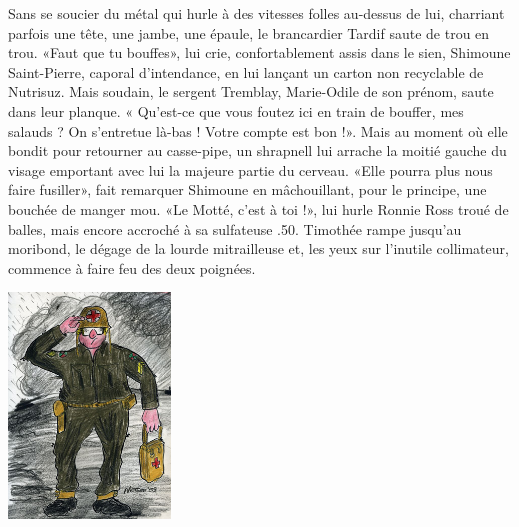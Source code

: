 
Sans se soucier du métal qui hurle à des vitesses folles au-dessus de lui, charriant parfois une tête, une jambe, une épaule, le brancardier Tardif saute de trou en trou. «Faut que tu bouffes», lui crie, confortablement assis dans le sien, Shimoune Saint-Pierre, caporal d’intendance, en lui lançant un carton non recyclable de Nutrisuz. Mais soudain, le sergent Tremblay, Marie-Odile de son prénom, saute dans leur planque. « Qu’est-ce que vous foutez ici en train de bouffer, mes salauds ? On s’entretue là-bas ! Votre compte est bon !». Mais au moment où elle bondit pour retourner au casse-pipe, un shrapnell lui arrache la moitié gauche du visage emportant avec lui la majeure partie du cerveau. «Elle pourra plus nous faire fusiller», fait remarquer Shimoune en mâchouillant, pour le principe, une bouchée de manger mou. «Le Motté, c’est à toi !», lui hurle Ronnie Ross troué de balles, mais encore accroché à sa sulfateuse .50. Timothée rampe jusqu’au moribond, le dégage de la lourde mitrailleuse et, les yeux sur l’inutile collimateur, commence à faire feu des deux poignées.

\begin{floatingfigure}[l]{50mm}
\includegraphics[height=60mm]{corps/chapitre18/img/personnage-timothee-guerre.jpg}
\end{floatingfigure}

